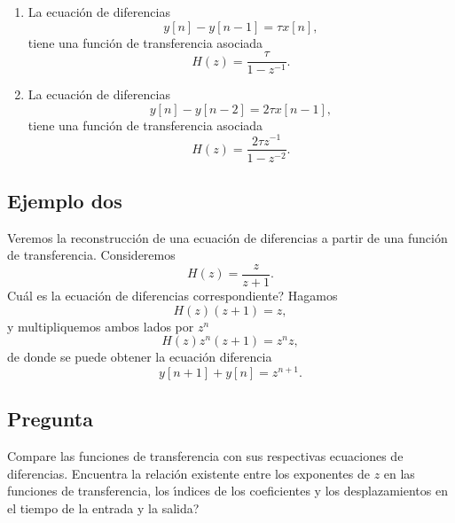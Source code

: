 \begin{enumerate}

\item La ecuaci\'{o}n de diferencias
\begin{equation}
  y[n] - y[n-1] = \tau x[n],
\end{equation}
tiene una funci\'{o}n de transferencia asociada
\begin{equation}
  H(z) = \frac{\tau}{1-z^{-1}}.
\end{equation}

\item La ecuaci\'{o}n de diferencias
\begin{equation}
  y[n] - y[n-2] = 2 \tau x[n-1],
\end{equation}
tiene una funci\'{o}n de transferencia asociada
\begin{equation}
  H(z) = \frac{2 \tau z^{-1}}{1-z^{-2}}.
\end{equation}

\end{enumerate}

\subsection{Ejemplo dos}

Veremos la reconstrucci\'{o}n de una ecuaci\'{o}n de diferencias a partir de
una funci\'{o}n de transferencia. Consideremos 
\begin{equation}
        H\left( z\right) =\frac{z}{z+1}.
\end{equation}
\textquestiondown Cu\'{a}l es la ecuaci\'{o}n de diferencias correspondiente?
Hagamos 
\begin{equation}
        H(z)\left( z+1\right) = z,
\end{equation}
y multipliquemos ambos lados por $z^n$
\begin{equation}
        H(z)z^n\left( z+1\right) =z^{n}z,
\end{equation}
de donde se puede obtener la ecuaci\'{o}n diferencia 
\begin{equation}
        y\left[ n+1\right] +y\left[ n\right] = z^{n+1} .
\end{equation}

\subsection{Pregunta}

Compare las funciones de transferencia con sus respectivas ecuaciones de diferencias.
\textquestiondown Encuentra la relaci\'{o}n existente entre los exponentes de $z$ en las funciones de 
transferencia, los \'{\i}ndices de los coeficientes y los desplazamientos en el tiempo de la entrada
y la salida?

